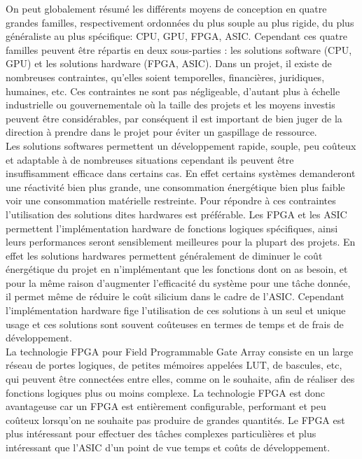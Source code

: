 \documentclass[a4paper,12pt]{article}
\begin{document}
On peut globalement résumé les différents moyens de conception en quatre grandes familles, respectivement ordonnées du plus souple au plus rigide, du plus généraliste au plus spécifique: CPU, GPU, FPGA, ASIC. Cependant ces quatre familles peuvent être répartis en deux sous-parties : les solutions software (CPU, GPU) et les solutions hardware (FPGA, ASIC).
Dans un projet, il existe de nombreuses contraintes, qu'elles soient temporelles, financières, juridiques, humaines, etc. Ces contraintes ne sont pas négligeable, d'autant plus à échelle industrielle ou gouvernementale où la taille des projets et les moyens investis peuvent être considérables, par conséquent il est important de bien juger de la direction à prendre dans le projet pour éviter un gaspillage de ressource.\\
Les solutions softwares permettent un développement rapide, souple, peu coûteux et adaptable à de nombreuses situations cependant ils peuvent être insuffisamment efficace dans certains cas. En effet certains systèmes demanderont une réactivité bien plus grande, une consommation énergétique bien plus faible voir une consommation matérielle restreinte. Pour répondre à ces contraintes l'utilisation des solutions dites hardwares est préférable. Les FPGA et les ASIC permettent l'implémentation hardware de fonctions logiques spécifiques, ainsi leurs performances seront sensiblement meilleures pour la plupart des projets. En effet les solutions hardwares permettent généralement de diminuer le coût énergétique du projet en n'implémentant que les fonctions dont on as besoin, et pour la même raison d'augmenter l'efficacité du système pour une tâche donnée, il permet même de réduire le coût silicium dans le cadre de l'ASIC. Cependant l'implémentation hardware fige l'utilisation de ces solutions à un seul et unique usage et ces solutions sont souvent coûteuses en termes de temps et de frais de développement.\\

La technologie FPGA pour Field Programmable Gate Array consiste en un large réseau de portes logiques, de petites mémoires appelées LUT, de bascules, etc, qui peuvent être connectées entre elles, comme on le souhaite, afin de réaliser des fonctions logiques plus ou moins complexe. La technologie FPGA est donc avantageuse car un FPGA est entièrement configurable, performant et peu coûteux lorsqu'on ne souhaite pas produire de grandes quantités. Le FPGA est plus intéressant pour effectuer des tâches complexes particulières et plus intéressant que l'ASIC d'un point de vue temps et coûts de développement.\\
\end{document}
